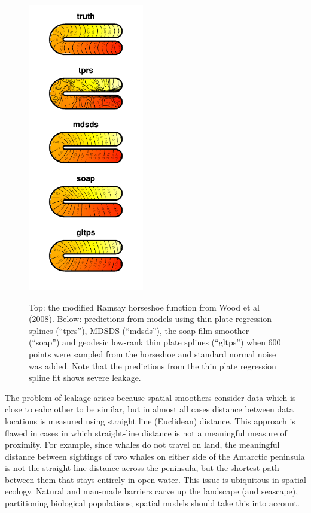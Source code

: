 \documentclass[useAMS, referee]{biom}
\begin{document}
\begin{figure}
\centering
\includegraphics[width=0.45\textwidth]{examples/ramsay/ramsay-real.pdf}\\
\caption{Top: the modified Ramsay horseshoe function from Wood et al (2008). Below: predictions from models using thin plate regression splines (``tprs''), MDSDS (``mdsds''), the soap film smoother (``soap'') and geodesic low-rank thin plate splines (``gltps'') when 600 points were sampled from the horseshoe and standard normal noise was added. Note that the predictions from the thin plate regression spline fit shows severe leakage.}
\label{leakage}
\end{figure}


The problem of leakage arises because spatial smoothers consider data which is close to eahc other to be similar, but in almost all cases distance between data locations is measured using straight line (Euclidean) distance. This approach is flawed in cases in which straight-line distance is not a meaningful measure of proximity. For example, since whales do not travel on land, the meaningful distance between sightings of two whales on either side of the Antarctic peninsula is not the straight line distance across the peninsula, but the shortest path between them that stays entirely in open water. This issue is ubiquitous in spatial ecology. Natural and man-made barriers carve up the landscape (and seascape), partitioning biological populations; spatial models should take this into account. 
\end{document}
